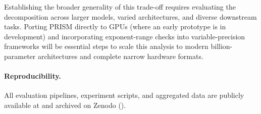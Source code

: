 Establishing the broader generality of this trade-off requires evaluating the
decomposition across larger models, varied architectures, and diverse downstream
tasks.
Porting PRISM directly to GPUs (where an early prototype is in development)
and incorporating exponent-range checks into variable-precision frameworks
will be essential steps to scale this analysis to modern billion-parameter
architectures and complete narrow hardware formats.

\paragraph{Reproducibility.}
All evaluation pipelines, experiment scripts, and aggregated data are publicly available at \githubrepo{}
and archived on Zenodo (\zenodorepo).

